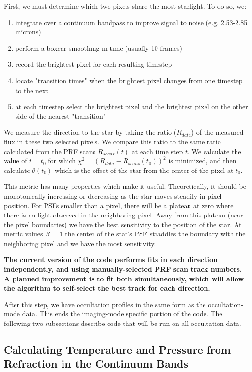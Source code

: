 \documentclass[12pt]{article}
\begin{document}
First, we must determine which two pixels share the most starlight. To do so,
we:
\begin{enumerate}
  \item integrate over a continuum bandpass to improve signal to noise (e.g. 2.53-2.85 microns)
  \item perform a boxcar smoothing in time (usually 10 frames)
  \item record the brightest pixel for each resulting timestep
  \item locate "transition times" when the brightest pixel changes from one timestep to the next
  \item at each timestep select the brightest pixel and the brightest pixel on the other side of the nearest "transition"
\end{enumerate}

We measure the direction to the star by taking the ratio ($R_{data}$) of the
measured flux in these two selected pixels.  We compare this ratio to the same
ratio calculated from the PRF scans $R_{scans}(t)$ at each time step $t$.  We
calculate the value of $t=t_0$ for which $\chi^2 = (R_{data}-R_{scans}(t_0))^2$
is minimized, and then calculate $\theta(t_0)$ which is the offset of the star
from the center of the pixel at $t_0$. 

This metric has many properties which make it useful. Theoretically, it should
be monotonically increasing or decreasing as the star moves steadily in pixel
position.  For PSFs smaller than a pixel, there will be a plateau at zero where
there is no light observed in the neighboring pixel. Away from this plateau
(near the pixel boundaries) we have the best sensitivity to the position of the
star. At metric values $R = 1$ the center of the star's PSF straddles the
boundary with the neighboring pixel and we have the most sensitivity.

{\bf The current version of the code performs fits in each direction independently,
and using manually-selected PRF scan track numbers. A planned improvement is to
fit both simultaneously, which will allow the algorithm to self-select the best
track for each direction.} 

After this step, we have occultation profiles in the same form as the
occultation-mode data. This ends the imaging-mode specific portion of the code.
The following two subsections describe code that will be run on all occultation
data.

\subsection{Calculating Temperature and Pressure from Refraction in the Continuum Bands}
\end{document}
